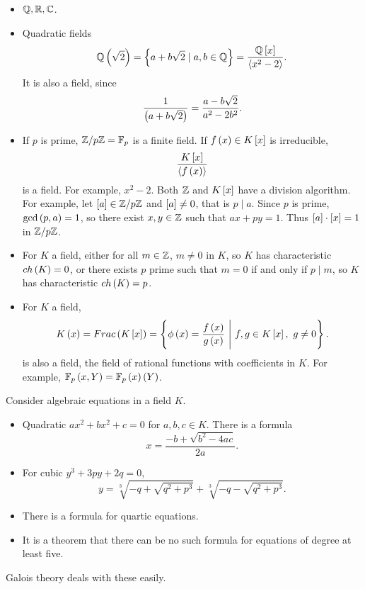 \begin{example1}
\hfill
\begin{itemize}
\item $ \Q, \R, \C $.
\item Quadratic fields
$$ \Q\rb{\sqrt{2}} = \cb{a + b\sqrt{2} \mid a, b \in \Q} = \dfrac{\Q\sb{x}}{\ab{x^2 - 2}}. $$
It is also a field, since
$$ \dfrac{1}{\rb{a + b\sqrt{2}}} = \dfrac{a - b\sqrt{2}}{a^2 - 2b^2}. $$
\item If $ p $ is prime, $ \Z / p\Z = \F_p $ is a finite field. If $ f\rb{x} \in K\sb{x} $ is irreducible,
$$ \dfrac{K\sb{x}}{\ab{f\rb{x}}} $$
is a field. For example, $ x^2 - 2 $. Both $ \Z $ and $ K\sb{x} $ have a division algorithm. For example, let $ \sb{a} \in \Z / p\Z $ and $ \sb{a} \ne 0 $, that is $ p \mid a $. Since $ p $ is prime, $ \gcd\rb{p, a} = 1 $, so there exist $ x, y \in \Z $ such that $ ax + py = 1 $. Thus $ \sb{a} \cdot \sb{x} = 1 $ in $ \Z / p\Z $.
\item For $ K $ a field, either for all $ m \in \Z $, $ m \ne 0 $ in $ K $, so $ K $ has characteristic $ ch\rb{K} = 0 $, or there exists $ p $ prime such that $ m = 0 $ if and only if $ p \mid m $, so $ K $ has characteristic $ ch\rb{K} = p $.
\item For $ K $ a field,
$$ K\rb{x} = Frac\rb{K\sb{x}} = \cb{\phi\rb{x} = \dfrac{f\rb{x}}{g\rb{x}} \ \Bigg| \ f, g \in K\sb{x}, \ g \ne 0}. $$
is also a field, the field of rational functions with coefficients in $ K $. For example, $ \F_p\rb{x, Y} = \F_p\rb{x}\rb{Y} $.
\end{itemize}
\end{example1}

\begin{example1}
Consider algebraic equations in a field $ K $.
\begin{itemize}
\item Quadratic $ ax^2 + bx^2 + c = 0 $ for $ a, b, c \in K $. There is a formula
$$ x = \dfrac{-b + \sqrt{b^2 - 4ac}}{2a}. $$
\item For cubic $ y^3 + 3py + 2q = 0 $,
$$ y = \sqrt[3]{-q + \sqrt{q^2 + p^3}} + \sqrt[3]{-q - \sqrt{q^2 + p^3}}. $$
\item There is a formula for quartic equations.
\item It is a theorem that there can be no such formula for equations of degree at least five.
\end{itemize}
Galois theory deals with these easily.
\end{example1}


